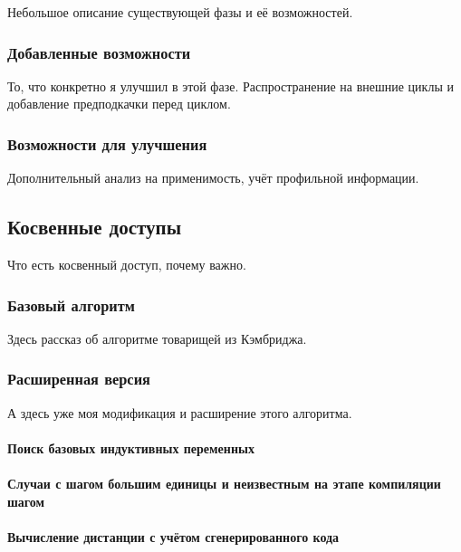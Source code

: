 \documentclass[12pt,a4paper]{article}
\begin{document}
Небольшое описание существующей фазы и её возможностей.

\subsubsection{Добавленные возможности}

То, что конкретно я улучшил в этой фазе. Распространение на внешние циклы и добавление предподкачки перед циклом.

\subsubsection{Возможности для улучшения}

Дополнительный анализ на применимость, учёт профильной информации.

\subsection{Косвенные доступы}

Что есть косвенный доступ, почему важно.

\subsubsection{Базовый алгоритм}

Здесь рассказ об алгоритме товарищей из Кэмбриджа.

\subsubsection{Расширенная версия}

А здесь уже моя модификация и расширение этого алгоритма.

\paragraph{Поиск базовых индуктивных переменных}

\paragraph{Случаи с шагом большим единицы и неизвестным на этапе компиляции шагом}

\paragraph{Вычисление дистанции с учётом сгенерированного кода}
\end{document}
